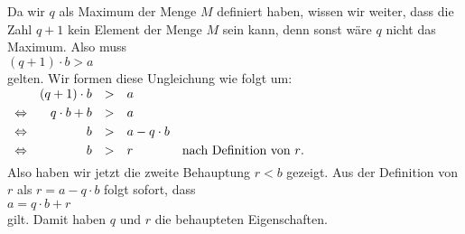 Da wir $q$ als Maximum der Menge $M$ definiert haben, wissen wir weiter, dass
die Zahl $q + 1$ kein Element der Menge $M$ sein kann, denn sonst w\"{a}re $q$ nicht das Maximum.
Also muss
\\[0.2cm]
\hspace*{1.3cm}
$(q+1) \cdot b > a$
\\[0.2cm]
gelten.  Wir formen diese Ungleichung wie folgt um:
\\[0.2cm]
\hspace*{1.3cm}
$
\begin{array}[t]{lrcll}
                & (q + 1) \cdot b & > & a                  \\[0.1cm]   
\Leftrightarrow & q \cdot b + b   & > & a                  \\[0.1cm]   
\Leftrightarrow & b               & > & a - q \cdot b      \\[0.1cm]   
\Leftrightarrow & b               & > & r & \mbox{nach Definition von $r$}. \\[0.1cm]   
\end{array}
$
\\[0.2cm]
Also haben wir jetzt die zweite Behauptung $r < b$ gezeigt.
Aus der Definition von $r$ als $r = a - q \cdot b$ folgt sofort, dass
\\[0.2cm]
\hspace*{1.3cm}
$a = q \cdot b + r$ 
\\[0.2cm]
gilt.  Damit haben $q$ und $r$ die behaupteten Eigenschaften.
\vspace*{0.2cm}

